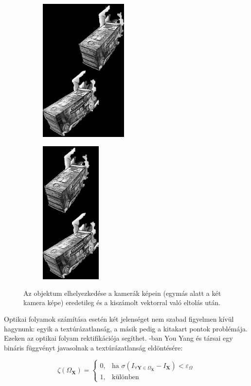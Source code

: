 \begin{figure}[tbh]
\centering
\begin{subfigure}[b]{.49\linewidth}
	\centering
	\includegraphics[height=205pt]{figures/before_shift.png}
  \end{subfigure}
\begin{subfigure}[b]{.49\linewidth}
	\centering
	\includegraphics[height=205pt]{figures/after_shift.png}
  \end{subfigure}
\caption{Az objektum elhelyezkedése a kamerák képein (egymás alatt a két kamera képe) eredetileg és a kiszámolt vektorral való eltolás után. \label{fig:shifted}}
\end{figure}

Optikai folyamok számítása esetén két jelenséget nem szabad figyelmen kívül hagynunk: egyik a textúrázatlanság, a másik pedig a kitakart pontok problémája. Ezeken az optikai folyam rektifikációja segíthet. \cite{optical-flow-rectification}-ban You Yang és társai egy bináris függvényt javasolnak a textúrázatlanság eldöntésére:

\[
    \zeta(\Omega_\mathbf{X})= 
\begin{cases}
    0,              & \text{ha } \sigma(I_{\forall \mathbf{Y}\in\Omega_\mathbf{X}} - I_\mathbf{X}) < \varepsilon_\Omega\\
    1,              & \text{különben}
\end{cases}
\]


